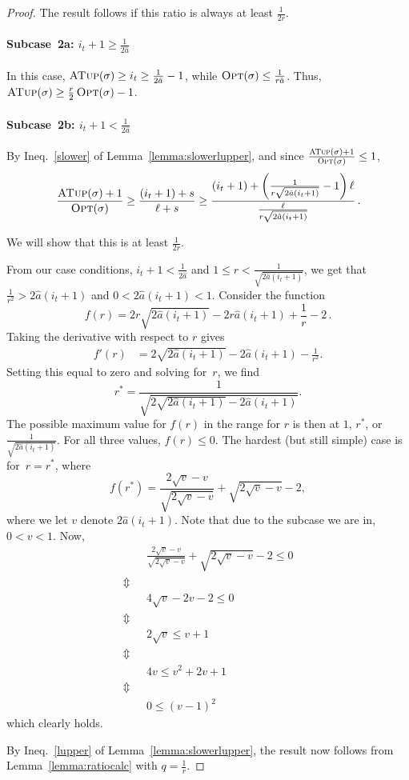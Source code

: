 \documentclass[a4paper,UKenglish,cleveref, autoref, thm-restate]{lipics-v2021}
\newcommand{\OPT}{\ensuremath{\operatorname{\textsc{Opt}}}\xspace}
\newcommand{\MLB}{\ensuremath{\operatorname{\textsc{ATup}}}\xspace}
\newcommand{\guess}{\ensuremath{\hat{a}}\xspace}
\begin{document}
\begin{proof}
The result follows if this ratio is always at least $\frac{1}{2r}$.

\paragraph*{Subcase~2a: $i_t+1 \geq \frac{1}{2\guess}$}

In this case, $\MLB(\sigma) \geq i_t \geq \frac{1}{2\guess}-1$, while
$\OPT(\sigma) \leq \frac{1}{r\guess}$. Thus,
$\MLB(\sigma)\geq \frac{r}{2}\OPT(\sigma)-1$.

\paragraph*{Subcase~2b: $i_t+1 < \frac{1}{2\guess}$}

By Ineq.~\ref{slower} of Lemma~\ref{lemma:slowerlupper}, and since
$\frac{\MLB(\sigma)+1}{\OPT(\sigma)}\leq 1$,
\[
     \frac{\MLB(\sigma)+1}{\OPT(\sigma)}
  \geq
  \frac{(i_t+1)+s}{\ell+s}
  \geq
  \frac{(i_t+1)+\left(
    \frac{1}{r\sqrt{2\guess(i_t+1)}} -1\right)\ell}{\frac{\ell}{r\sqrt{2\guess(i_t+1)}}}\,.
\]

We will show that this is at least $\frac{1}{2r}$.


From our case conditions, $i_t+1<\frac{1}{2\guess}$ and
$1\leq r<\frac{1}{\sqrt{2\guess(i_t+1)}}$, we get that
$\frac{1}{r^2} >2\guess(i_t+1)$ and $0<2\guess(i_t+1)<1$.  Consider the
function $$f(r)=2r\sqrt{2\guess(i_t+1)}-2r\guess(i_t+1)+\frac{1}{r}-2\,.$$
Taking the derivative with respect to $r$ gives
\begin{align*}
  f'(r) & =2\sqrt{2\guess(i_t+1)}-2\guess(i_t+1)-\frac{1}{r^2}.
\end{align*}
Setting this equal to zero and solving for~$r$, we find
\[r^{\ast} = \frac{1}{\sqrt{2\sqrt{2\guess(i_t+1)}-2\guess(i_t+1)}}.\]
The possible maximum value for $f(r)$ in the range for $r$ is
then at $1$, $r^{\ast}$, or $\frac{1}{\sqrt{2\guess(i_t+1)}}$.
For all three values, $f(r)\leq 0$. The hardest (but still
simple) case is for~$r=r^{\ast}$, where
\[f(r^{\ast}) = \frac{2\sqrt{v} - v}{\sqrt{2\sqrt{v}-v}} + \sqrt{2\sqrt{v}-v} - 2,\]
where we let $v$ denote $2\guess(i_t+1)$.
Note that due to the subcase we are in, $0<v<1$.
Now,
\begin{align*}
    & \frac{2\sqrt{v} - v}{\sqrt{2\sqrt{v}-v}} + \sqrt{2\sqrt{v}-v} - 2 \leq 0 \\
      \Updownarrow~~~ \\
    & 4\sqrt{v} - 2v - 2 \leq 0 \\
    \Updownarrow~~~ \\
    & 2\sqrt{v} \leq v + 1 \\
    \Updownarrow~~~ \\
    & 4v \leq v^2 + 2v + 1 \\
    \Updownarrow~~~ \\
    & 0 \leq (v-1)^2
\end{align*}
which clearly holds.

By Ineq.~\ref{lupper} of Lemma~\ref{lemma:slowerlupper}, the result now
follows from Lemma~\ref{lemma:ratiocalc} with $q=\frac1r$.
\end{proof}
\end{document}
